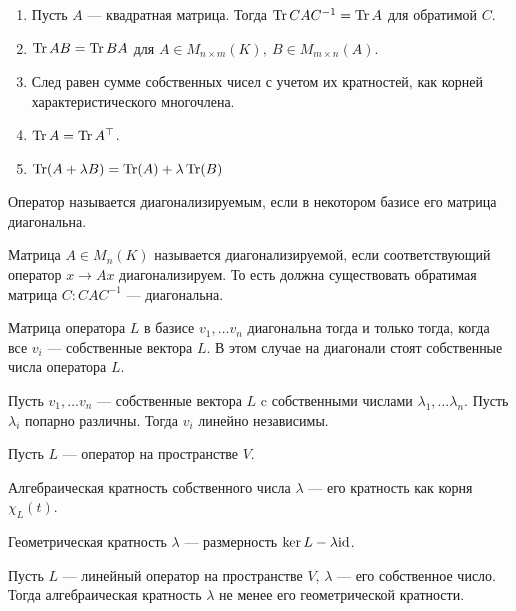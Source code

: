 \begin{lm}
    \begin{enumerate}[noitemsep]
        \item Пусть $ A$ --- квадратная матрица. Тогда  $ \operatorname{Tr} C A C^{-1} = \operatorname{Tr} A$ для обратимой $ C$.
	\item $ \operatorname{Tr} AB = \operatorname{Tr} BA$ для  $ A \in M_{n\times m}(K) , ~ B \in M_{m\times n}(A)$.
	\item След равен сумме собственных чисел с учетом их кратностей, как корней характеристического многочлена.
	\item $ \operatorname{Tr} A = \operatorname{Tr} A^{\top}$.
	\item $ \operatorname{Tr}(A + \lambda B) = \operatorname{Tr}(A) + \lambda \operatorname{Tr}(B)$
    \end{enumerate} 
\end{lm}
\begin{defn}[Диагонализируемость]
    Оператор называется {\sf диагонализируемым}, если в некотором базисе его матрица диагональна.

    Матрица $ A \in M_n(K)$ называется {\sf диагонализируемой}, если соответствующий оператор $ x \to Ax$ диагонализируем.  То есть должна существовать обратимая матрица $ C\colon C A C^{-1} $ --- диагональна.
\end{defn}
\begin{lm}
    Матрица оператора $ L$ в базисе  $ v_1, \ldots v_n$ диагональна тогда и только тогда, когда все $ v_i$ --- собственные  вектора  $ L$. В этом случае на диагонали стоят собственные числа оператора  $ L$.
\end{lm}
\begin{lm}
    Пусть $ v_1, \ldots v_n$ --- собственные вектора $ L$ c собственными числами  $ \lambda _1, \ldots \lambda _n$. Пусть $ \lambda _i$ попарно различны. Тогда $ v_i$ линейно независимы.
\end{lm}
\begin{defn}
    Пусть $ L$ --- оператор на пространстве  $ V$. 

    {\sf Алгебраическая кратность собственного числа $ \lambda $} --- его кратность как корня $ \chi_L(t)$.    

    {\sf Геометрическая кратность $ \lambda$} ---  размерность $ \ker L - \lambda {\mathop{\text{\rm id}}}$.  
\end{defn}
\begin{lm}[Неравенство]
    Пусть $ L$ --- линейный оператор на пространстве $ V$,  $ \lambda $ --- его собственное число. Тогда алгебраическая кратность $ \lambda $ не менее его геометрической кратности.
\end{lm}
